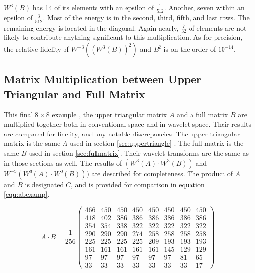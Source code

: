 $W^3(B)$ has 14 of its elements with an epsilon of $\frac{1}{512}$.  Another, seven within an epsilon of $\frac{3}{512}$.  Most of the energy is in the second, third, fifth, and last rows.   The remaining energy is located in the diagonal.  Again nearly, $\frac{7}{32}$ of elements are not likely to contribute anything significant to this multiplication.   As for precision, the relative fidelity of  $W^{-3}((W^3(B))^2)$ and $B^2$ is on the order of $10^{-14}$.  


\subsection {Matrix Multiplication between Upper Triangular and Full Matrix}
This final $8\times 8$ example , the upper triangular matrix $A$ and a full matrix $B$ are multiplied together both in conventional space and in wavelet space.  Their results are compared for fidelity, and any notable discrepancies.  The upper triangular matrix is the same $A$ used in section \ref{sec:uppertriangle} .  The full matrix is the same $B$ used in section \ref{sec:fullmatrix}.  Their wavelet transforms are the same as in those sections as well.   The results of $(W^3(A) \cdot W^3(B))$ and $W^{-3}(W^3(A) \cdot W^3(B)))$ are described 
for completeness.  The product of $A$ and $B$ is designated $C$, and is %
provided for comparison in equation \ref{equ:abexamp}.

\begin{equation}
\label {equ:abexamp}
A \cdot B = \frac{1}{256}\left( 
\begin{array}{cccccccc} 
466 & 450 & 450 & 450 & 450 & 450 & 450 & 450\\
418 & 402 & 386 & 386 & 386 & 386 & 386 & 386\\
354 & 354 & 338 & 322 & 322 & 322 & 322 & 322\\
290 & 290 & 290 & 274 & 258 & 258 & 258 & 258\\
225 & 225 & 225 & 225 & 209 & 193 & 193 & 193\\
161 & 161 & 161 & 161 & 161 & 145 & 129 & 129\\
97 & 97 & 97 & 97 & 97 & 97 & 81 & 65\\
33 & 33 & 33 & 33 & 33 & 33 & 33 & 17 
\end{array} \right)
\end{equation}

